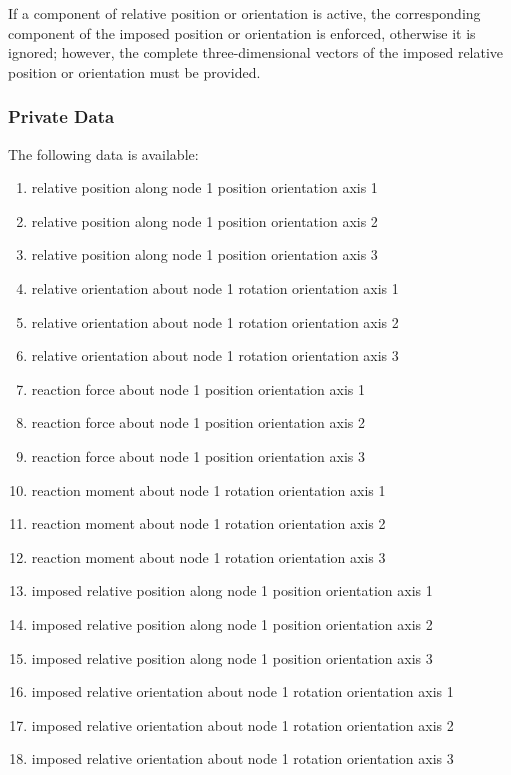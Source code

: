 If a component of relative position or orientation is active,
the corresponding component of the imposed position or orientation
is enforced, otherwise it is ignored;
however, the complete three-dimensional vectors of the imposed relative
position or orientation must be provided.

\subsubsection{Private Data}
The following data is available:
\begin{enumerate}
\item {} relative position along node 1 position orientation axis 1
\item {} relative position along node 1 position orientation axis 2
\item {} relative position along node 1 position orientation axis 3
\item {} relative orientation about node 1 rotation orientation axis 1
\item {} relative orientation about node 1 rotation orientation axis 2
\item {} relative orientation about node 1 rotation orientation axis 3
\item {} reaction force about node 1 position orientation axis 1
\item {} reaction force about node 1 position orientation axis 2
\item {} reaction force about node 1 position orientation axis 3
\item {} reaction moment about node 1 rotation orientation axis 1
\item {} reaction moment about node 1 rotation orientation axis 2
\item {} reaction moment about node 1 rotation orientation axis 3
\item {} imposed relative position along node 1 position orientation axis 1
\item {} imposed relative position along node 1 position orientation axis 2
\item {} imposed relative position along node 1 position orientation axis 3
\item {} imposed relative orientation about node 1 rotation orientation axis 1
\item {} imposed relative orientation about node 1 rotation orientation axis 2
\item {} imposed relative orientation about node 1 rotation orientation axis 3
\end{enumerate}

